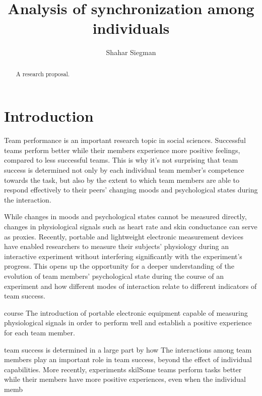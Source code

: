 \documentclass[a4paper, 11pt]{article}      %
\title{\LARGE \bf
Analysis of synchronization among individuals
}
\author{Shahar Siegman}
\begin{document}
\maketitle
\thispagestyle{empty}
\pagestyle{empty}


\begin{abstract}

A research proposal.

\end{abstract}

\section{Introduction}
Team performance is an important research topic in social sciences. Successful teams perform better while their members experience more positive feelings, compared to less successful teams. This is why it's not surprising that team success is determined not only by each individual team member's competence towards the task, but also by the extent to which team members are able to respond effectively to their peers' changing moods and psychological states during the interaction.

While changes in moods and psychological states cannot be measured directly, changes in physiological signals such as heart rate and skin conductance can serve as proxies. Recently, portable and lightweight electronic measurement devices have enabled researchers to measure their subjects' physiology during an interactive experiment without interfering significantly with the experiment's progress. This opens up the opportunity for a deeper understanding of the evolution of team members' psychological state during the course of an experiment and how different modes of interaction relate to different indicators of team success.


course
The introduction of portable electronic equipment capable of measuring physiological signals    
in order to perform well and establish a positive experience for each team member.



team success is determined in a large part by how The  interactions among team members play an important role in team success, beyond the effect of individual capabilities. More recently, experiments 
skilSome teams perform tasks better while their members have more positive experiences, even when the individual memb 
\end{document}
